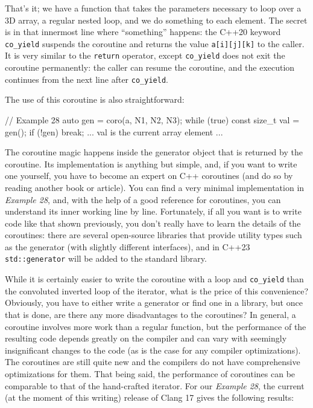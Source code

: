 That's it; we have a function that takes the parameters necessary to loop over a 3D array, a regular nested loop, and we do something to each element. The secret is in that innermost line where ``something'' happens: the C++20 keyword \texttt{co\_yield} suspends the coroutine and returns the value \texttt{a{[}i{]}{[}j{]}{[}k{]}} to the caller. It is very similar to the \texttt{return} operator, except \texttt{co\_yield} does not exit the coroutine permanently: the caller can resume the coroutine, and the execution continues from the next line after \texttt{co\_yield}.

The use of this coroutine is also straightforward:

\begin{code}
// Example 28
auto gen = coro(a, N1, N2, N3);
while (true) {
  const size_t val = gen();
  if (!gen) break;
  ... val is the current array element ...
}
\end{code}

The coroutine magic happens inside the generator object that is returned by the coroutine. Its implementation is anything but simple, and, if you want to write one yourself, you have to become an expert on C++ coroutines (and do so by reading another book or article). You can find a very minimal implementation in \emph{Example 28}, and, with the help of a good reference for coroutines, you can understand its inner working line by line. Fortunately, if all you want is to write code like that shown previously, you don't really have to learn the details of the coroutines: there are several open-source libraries that provide utility types such as the generator (with slightly different interfaces), and in C++23 \texttt{std::generator} will be added to the standard library.

While it is certainly easier to write the coroutine with a loop and \texttt{co\_yield} than the convoluted inverted loop of the iterator, what is the price of this convenience? Obviously, you have to either write a generator or find one in a library, but once that is done, are there any more disadvantages to the coroutines? In general, a coroutine involves more work than a regular function, but the performance of the resulting code depends greatly on the compiler and can vary with seemingly insignificant changes to the code (as is the case for any compiler optimizations). The coroutines are still quite new and the compilers do not have comprehensive optimizations for them. That being said, the performance of coroutines can be comparable to that of the hand-crafted iterator. For our \emph{Example 28}, the current (at the moment of this writing) release of Clang 17 gives the following results:

